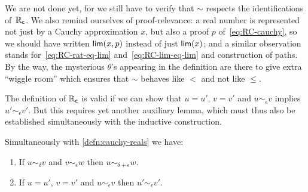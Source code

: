 We are not done yet, for we still have to verify that $\sim$ respects the identifications
of~$\mathbb{R}_\mathsf{c}$. We also remind ourselves of proof-relevance: a real number is represented not
just by a Cauchy approximation $x$, but also a proof $p$ of~\eqref{eq:RC-cauchy}, so we
should have written $\mathsf{lim}(x,p)$ instead of just $\mathsf{lim}(x)$; and a similar observation
stands for~\eqref{eq:RC-rat-eq-lim} and~\eqref{eq:RC-lim-eq-lim} and construction of
paths. By the way, the mysterious $\theta$'s appearing in the definition are there to give
extra ``wiggle room'' which ensures that $\sim$ behaves like $<$ and not like $\leq$.

The definition of $\mathbb{R}_\mathsf{c}$ is valid if we can show that $u = u'$, $v = v'$ and $u
\sim_\epsilon v$ implies $u' \sim_\epsilon v'$. But this requires yet another auxiliary
lemma, which must thus also be established simultaneously with the inductive construction.

\begin{lem}\label{lem:RC-well-defined}
  Simultaneously with \autoref{defn:cauchy-reals} we have:
  \begin{enumerate}
  \item \label{RC-well-defined-i}
    If $u \sim_\delta v$ and $v \sim_\epsilon w$ then $u \sim_{\delta + \epsilon} w$.
  \item \label{RC-well-defined-ii}
    If $u = u'$, $v = v'$ and $u \sim_\epsilon v$ then $u' \sim_\epsilon v'$.
  \end{enumerate}
\end{lem}

